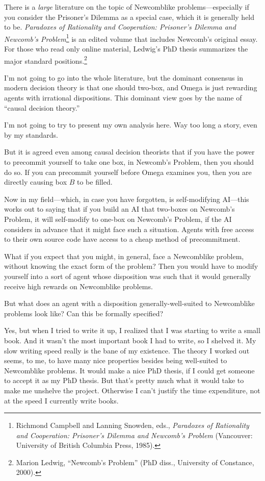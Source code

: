{
 There is a \textit{large} literature on the topic of Newcomblike
problems---especially if you consider the Prisoner's
Dilemma as a special case, which it is generally held to be.
\textit{Paradoxes of Rationality and Cooperation:
Prisoner's Dilemma and Newcomb's
Problem}\footnote{Richmond Campbell and Lanning Snowden, eds., \textit{Paradoxes
of Rationality and Cooperation: Prisoner's Dilemma and
Newcomb's Problem} (Vancouver: University of British
Columbia Press, 1985).} is an edited volume that includes
Newcomb's original essay. For those who read only
online material, Ledwig's PhD thesis summarizes the
major standard positions.\footnote{Marion Ledwig, ``Newcomb's
Problem'' (PhD diss., University of Constance,
2000).}}

{
 I'm not going to go into the whole literature, but
the dominant consensus in modern decision theory is that one should
two-box, and Omega is just rewarding agents with irrational
dispositions. This dominant view goes by the name of
``causal decision theory.''}

{
 I'm not going to try to present my own analysis
here. Way too long a story, even by my standards.}

{
 But it is agreed even among causal decision theorists that if you
have the power to precommit yourself to take one box, in
Newcomb's Problem, then you should do so. If you can
precommit yourself before Omega examines you, then you are directly
causing box $B$ to be filled.}

{
 Now in my field---which, in case you have forgotten, is
self-modifying AI---this works out to saying that if you build an AI
that two-boxes on Newcomb's Problem, it will
self-modify to one-box on Newcomb's Problem, if the AI
considers in advance that it might face such a situation. Agents with
free access to their own source code have access to a cheap method of
precommitment.}

{
 What if you expect that you might, in general, face a Newcomblike
problem, without knowing the exact form of the problem? Then you would
have to modify yourself into a sort of agent whose disposition was such
that it would generally receive high rewards on Newcomblike problems.}

{
 But what does an agent with a disposition generally-well-suited to
Newcomblike problems look like? Can this be formally specified?}

{
 Yes, but when I tried to write it up, I realized that I was
starting to write a small book. And it wasn't the most
important book I had to write, so I shelved it. My slow writing speed
really is the bane of my existence. The theory I worked out seems, to
me, to have many nice properties besides being well-suited to
Newcomblike problems. It would make a nice PhD thesis, if I could get
someone to accept it as my PhD thesis. But that's
pretty much what it would take to make me unshelve the project.
Otherwise I can't justify the time expenditure, not at
the speed I currently write books.}

